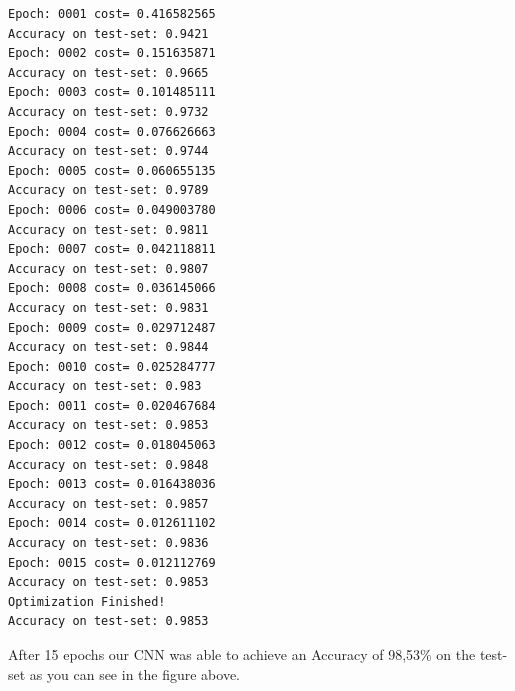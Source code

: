 \documentclass[12pt]{article}
\begin{document}
\newpage
\begin{verbatim}
Epoch: 0001 cost= 0.416582565
Accuracy on test-set: 0.9421
Epoch: 0002 cost= 0.151635871
Accuracy on test-set: 0.9665
Epoch: 0003 cost= 0.101485111
Accuracy on test-set: 0.9732
Epoch: 0004 cost= 0.076626663
Accuracy on test-set: 0.9744
Epoch: 0005 cost= 0.060655135
Accuracy on test-set: 0.9789
Epoch: 0006 cost= 0.049003780
Accuracy on test-set: 0.9811
Epoch: 0007 cost= 0.042118811
Accuracy on test-set: 0.9807
Epoch: 0008 cost= 0.036145066
Accuracy on test-set: 0.9831
Epoch: 0009 cost= 0.029712487
Accuracy on test-set: 0.9844
Epoch: 0010 cost= 0.025284777
Accuracy on test-set: 0.983
Epoch: 0011 cost= 0.020467684
Accuracy on test-set: 0.9853
Epoch: 0012 cost= 0.018045063
Accuracy on test-set: 0.9848
Epoch: 0013 cost= 0.016438036
Accuracy on test-set: 0.9857
Epoch: 0014 cost= 0.012611102
Accuracy on test-set: 0.9836
Epoch: 0015 cost= 0.012112769
Accuracy on test-set: 0.9853
Optimization Finished!
Accuracy on test-set: 0.9853
\end{verbatim}

After 15 epochs our CNN was able to achieve an Accuracy of 98,53\% on the test-set as you can see in the figure above.
\end{document}
